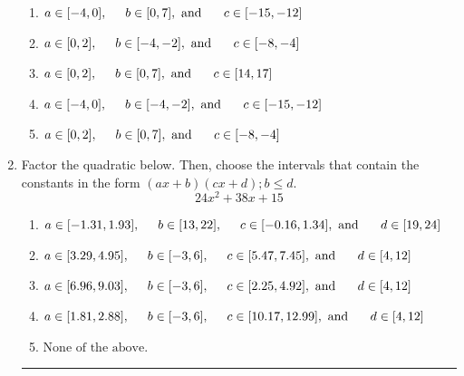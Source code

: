 \documentclass[14pt]{extbook}
\newcommand{\litem}[1]{\item#1\hspace*{-1cm}\rule{\textwidth}{0.4pt}}
\begin{document}
\begin{enumerate}
{\begin{center}
\end{center}
\begin{enumerate}[label=\Alph*.]
\item \( a \in [-4, 0], \hspace*{5mm} b \in [0, 7], \text{ and } \hspace*{5mm} c \in [-15, -12] \)
\item \( a \in [0, 2], \hspace*{5mm} b \in [-4, -2], \text{ and } \hspace*{5mm} c \in [-8, -4] \)
\item \( a \in [0, 2], \hspace*{5mm} b \in [0, 7], \text{ and } \hspace*{5mm} c \in [14, 17] \)
\item \( a \in [-4, 0], \hspace*{5mm} b \in [-4, -2], \text{ and } \hspace*{5mm} c \in [-15, -12] \)
\item \( a \in [0, 2], \hspace*{5mm} b \in [0, 7], \text{ and } \hspace*{5mm} c \in [-8, -4] \)

\end{enumerate} }
\litem{
Factor the quadratic below. Then, choose the intervals that contain the constants in the form $(ax+b)(cx+d); b \leq d.$\[ 24x^{2} +38 x + 15 \]\begin{enumerate}[label=\Alph*.]
\item \( a \in [-1.31, 1.93], \hspace*{5mm} b \in [13, 22], \hspace*{5mm} c \in [-0.16, 1.34], \text{ and } \hspace*{5mm} d \in [19, 24] \)
\item \( a \in [3.29, 4.95], \hspace*{5mm} b \in [-3, 6], \hspace*{5mm} c \in [5.47, 7.45], \text{ and } \hspace*{5mm} d \in [4, 12] \)
\item \( a \in [6.96, 9.03], \hspace*{5mm} b \in [-3, 6], \hspace*{5mm} c \in [2.25, 4.92], \text{ and } \hspace*{5mm} d \in [4, 12] \)
\item \( a \in [1.81, 2.88], \hspace*{5mm} b \in [-3, 6], \hspace*{5mm} c \in [10.17, 12.99], \text{ and } \hspace*{5mm} d \in [4, 12] \)
\item \( \text{None of the above.} \)


\end{enumerate}}
\end{enumerate}
\end{document}
